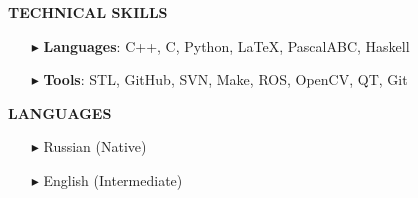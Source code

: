 \documentclass[a4paper,10pt]{article}
\begin{document}
	
	
	\colorbox{magicmint}{
		\begin{minipage}{0.96\textwidth}
			\vphantom{.}
			\textbf{TECHNICAL SKILLS}
		\end{minipage}
	}
	\begin{itemize}
		\item [$\blacktriangleright$]  \textbf{Languages}: C++, C, Python, \LaTeX, PascalABC, Haskell
		\item [$\blacktriangleright$]  \textbf{Tools}: STL, GitHub, SVN, Make, ROS, OpenCV, QT, Git
	\end{itemize}
	 
	
	\colorbox{magicmint}{
		\begin{minipage}{0.96\textwidth}
			\vphantom{.}
			\textbf{LANGUAGES}
		\end{minipage}
	}
	\begin{itemize}
		\item[$\blacktriangleright$]  Russian (Native)
		\item[$\blacktriangleright$]  English (Intermediate)
	\end{itemize}
	
\end{document}
